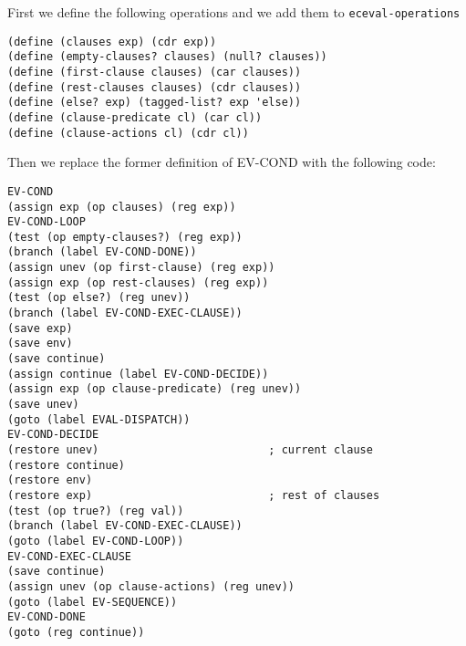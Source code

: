 \documentclass[a4paper,12pt]{article}
\begin{document}
First we define the following operations and we add them to
\lstinline!eceval-operations!
\begin{lstlisting}
(define (clauses exp) (cdr exp))
(define (empty-clauses? clauses) (null? clauses))
(define (first-clause clauses) (car clauses))
(define (rest-clauses clauses) (cdr clauses))
(define (else? exp) (tagged-list? exp 'else))
(define (clause-predicate cl) (car cl))
(define (clause-actions cl) (cdr cl))
\end{lstlisting}

Then we replace the former definition of EV-COND with the following
code:

\begin{lstlisting}
EV-COND
(assign exp (op clauses) (reg exp))
EV-COND-LOOP
(test (op empty-clauses?) (reg exp))
(branch (label EV-COND-DONE))
(assign unev (op first-clause) (reg exp))
(assign exp (op rest-clauses) (reg exp))
(test (op else?) (reg unev))
(branch (label EV-COND-EXEC-CLAUSE))
(save exp)
(save env)
(save continue)
(assign continue (label EV-COND-DECIDE))
(assign exp (op clause-predicate) (reg unev))
(save unev)
(goto (label EVAL-DISPATCH))
EV-COND-DECIDE
(restore unev)                          ; current clause
(restore continue)
(restore env)
(restore exp)                           ; rest of clauses
(test (op true?) (reg val))
(branch (label EV-COND-EXEC-CLAUSE))
(goto (label EV-COND-LOOP))
EV-COND-EXEC-CLAUSE
(save continue)
(assign unev (op clause-actions) (reg unev))
(goto (label EV-SEQUENCE))
EV-COND-DONE
(goto (reg continue))
\end{lstlisting}
\end{document}
